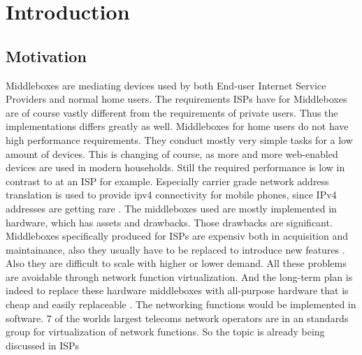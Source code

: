 \documentclass[11pt,a4paper,twoside,openright,bachelor,english]{netthesis}
\author{Simon Sternsdorf}
\begin{document}
%


\maketitle%





%

{\tableofcontents}
{\listoffigures}
{\listoftables}

\cleardoublepage


\chapter{Introduction}

\section{Motivation}
Middleboxes are mediating devices used by both End-user Internet Service Providers and normal home users. The requirements ISPs have for Middleboxes are of course vastly different from the requirements of private users. Thus the implementations differs greatly as well. Middleboxes for home users do not have high performance requirements. They conduct mostly very simple tasks for a low amount of devices. This is changing of course, as more and more web-enabled devices are used in modern households. 
Still the required performance is low in contrast to at an ISP for example. Especially carrier grade network address translation is used to provide ipv4 connectivity for mobile phones, since IPv4 addresses are getting rare \cite{A10}. The middleboxes used are mostly implemented in hardware, which has assets and drawbacks. Those drawbacks are significant. 
Middleboxes specifically produced for ISPs are expensiv both in acquisition and maintainance, also they usually have to be replaced to introduce new features \cite{WhiteP}. Also they are difficult to scale with higher or lower demand. All these problems are avoidable through network function virtualization. And the long-term plan is indeed to replace these hardware middleboxes with all-purpose hardware that is cheap and easily replaceable \cite{Click}. The networking functions would be implemented in software. 7 of the worlds largest telecoms network operators are in an standards group for virtualization of network functions. So the topic is already being discussed in ISPs \cite{NetDis} 
\end{document}
